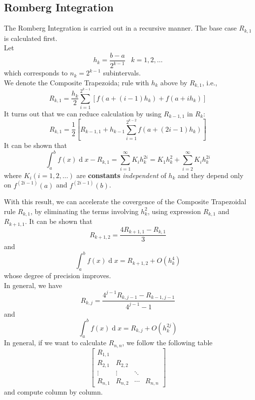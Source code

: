 \documentclass[12pt]{article}
\theoremstyle{definition}
\DeclareMathOperator{\diff}{d}
\begin{document}
\subsection{Romberg Integration}
The Romberg Integration is carried out in a recursive manner. The base case $R_{k,1}$ is calculated first.\\
Let
\[
h_k=\frac{b-a}{2^{k-1}}\;\;\;k=1,2,\ldots
\]
which corresponds to $n_k=2^{k-1}$ subintervals.\\
We denote the Composite Trapezoida; rule with $h_k$ above by $R_{k,1}$, i.e.,
\[
R_{k,1}=\frac{h_k}{2}\sum_{i=1}^{2^{k-1}}[f(a+(i-1)h_k)+f(a+ih_k)]
\]
It turns out that we can reduce calculation by using $R_{k-1,1}$ in $R_{k}$:
\[
R_{k,1}=\frac{1}{2}[R_{k-1,1}+h_{k-1}\sum_{i=1}^{2^{k-2}}f(a+(2i-1)h_k)]
\]
It can be shown that
\[
\int_a^bf(x)\diff x -R_{k,1}=\sum_{i=1}^\infty K_ih_k^{2i}=K_1h_k^2+\sum_{i=2}^\infty K_ih_k^{2i}
\]
where $K_i (i=1,2,\ldots)$ are \textbf{constants} \textit{independent} of $h_k$ and they depend only on $f^{(2i-1)}(a)$ and $f^{(2i-1)}(b)$.

With this result, we can accelerate the covergence of the Composite Trapezoidal rule $R_{k,1}$, by eliminating the terms involving $h_k^2$, using expression $R_{k,1}$ and $R_{k+1,1}$. It can be shown that
\[
R_{k+1,2}=\frac{4R_{k+1,1}-R_{k,1}}{3}
\]
and 
\[
\int_a^bf(x)\diff x = R_{k+1,2}+O(h_k^4)
\]
whose degree of precision improves.\\
In general, we have
\[
R_{k,j}=\frac{4^{j-1}R_{k,j-1}-R_{k-1,j-1}}{4^{j-1}-1}
\]
and
\[
\int_a^bf(x)\diff x = R_{k,j}+O(h_k^{2j})
\]
In general, if we want to calculate $R_{n,n}$, we follow the following table
\[
\begin{bmatrix}
R_{1,1}&&&\\
R_{2,1}&R_{2,2}&&\\
\vdots&\vdots&\ddots&\\
R_{n,1}&R_{n,2}&\cdots&R_{n,n}
\end{bmatrix}
\]
and compute column by column.
\end{document}
